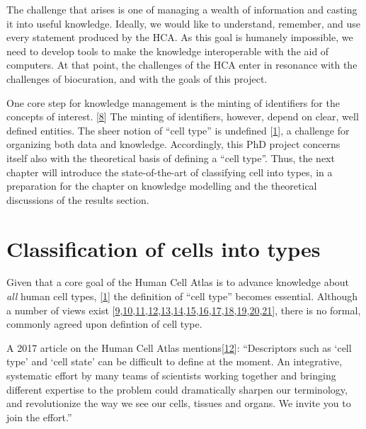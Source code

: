 The challenge that arises is one of managing a wealth of information and casting it into useful knowledge.
Ideally, we would like to understand, remember, and use every statement produced by the HCA.
As this goal is humanely impossible, we need to develop tools to make the knowledge interoperable with the aid of computers.
At that point, the challenges of the HCA enter in resonance with the challenges of biocuration, and with the goals of this project.

One core step for knowledge management is the minting of identifiers for the concepts of interest. {[}\protect\hyperlink{ref-tvnuubVW}{8}{]}
The minting of identifiers, however, depend on clear, well defined entities.
The sheer notion of ``cell type'' is undefined {[}\protect\hyperlink{ref-1GmbExweg}{1}{]}, a challenge for organizing both data and knowledge.
Accordingly, this PhD project concerns itself also with the theoretical basis of defining a ``cell type''.
Thus, the next chapter will introduce the state-of-the-art of classifying cell into types, in a preparation for the chapter on knowledge modelling and the theoretical discussions of the results section.

\hypertarget{classification-of-cells-into-types}{%
\section{Classification of cells into types}\label{classification-of-cells-into-types}}

Given that a core goal of the Human Cell Atlas is to advance knowledge about \emph{all} human cell types, {[}\protect\hyperlink{ref-1GmbExweg}{1}{]} the definition of ``cell type'' becomes essential.
Although a number of views exist {[}\protect\hyperlink{ref-paKiKTRS}{9},\protect\hyperlink{ref-sWv3okaH}{10},\protect\hyperlink{ref-19yYJWEkz}{11},\protect\hyperlink{ref-BlxFp1v3}{12},\protect\hyperlink{ref-eOUB1Bmj}{13},\protect\hyperlink{ref-TupzTvtA}{14},\protect\hyperlink{ref-w0Woz7JE}{15},\protect\hyperlink{ref-srfuRMe}{16},\protect\hyperlink{ref-1GXQByEaQ}{17},\protect\hyperlink{ref-k0Pe9YOB}{18},\protect\hyperlink{ref-pNGap1Du}{19},\protect\hyperlink{ref-MoaYZAA0}{20},\protect\hyperlink{ref-WAeCfntu}{21}{]}, there is no formal, commonly agreed upon defintion of cell type.

A 2017 article on the Human Cell Atlas mentions{[}\protect\hyperlink{ref-BlxFp1v3}{12}{]}:
``Descriptors such as `cell type' and `cell state' can be difficult to define at the moment. An integrative, systematic effort by many teams of scientists working together and bringing different expertise to the problem could dramatically sharpen our terminology, and revolutionize the way we see our cells, tissues and organs. We invite you to join the effort.''

